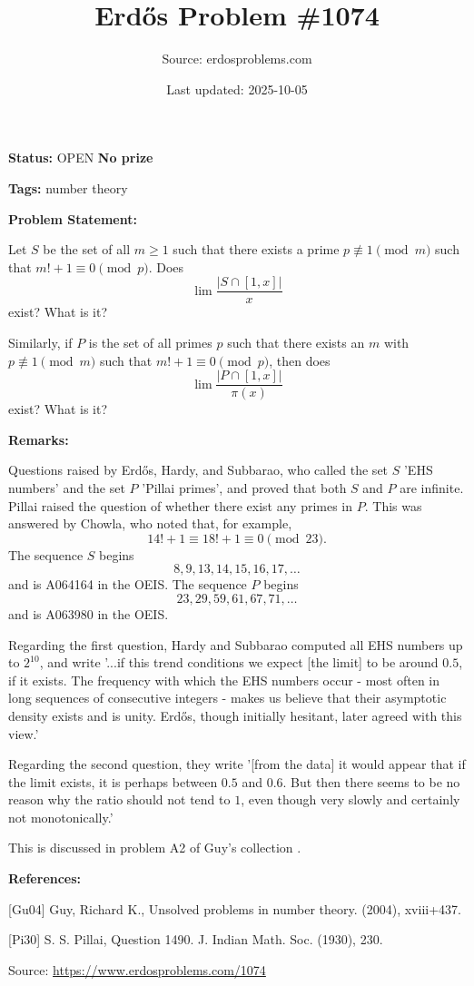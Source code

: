 \documentclass{article}
\title{Erd\H{o}s Problem \#1074}
\date{Last updated: 2025-10-05}
\author{Source: erdosproblems.com}
\begin{document}
\maketitle

\noindent\textbf{Status:} OPEN \quad \textbf{No prize}

\noindent\textbf{Tags:} number theory

\medskip
\noindent\textbf{Problem Statement:}

Let $S$ be the set of all $m\geq 1$ such that there exists a prime $p\not\equiv 1\pmod{m}$ such that $m!+1\equiv 0\pmod{p}$. Does\[\lim \frac{\lvert S\cap [1,x]\rvert}{x}\]exist? What is it?

Similarly, if $P$ is the set of all primes $p$ such that there exists an $m$ with $p\not\equiv 1\pmod{m}$ such that $m!+1\equiv 0\pmod{p}$, then does\[\lim \frac{\lvert P\cap [1,x]\rvert}{\pi(x)}\]exist? What is it?

\bigskip
\noindent\textbf{Remarks:}

Questions raised by Erd\H{o}s, Hardy, and Subbarao, who called the set $S$ 'EHS numbers' and the set $P$ 'Pillai primes', and proved that both $S$ and $P$ are infinite. Pillai \cite{Pi30} raised the question of whether there exist any primes in $P$. This was answered by Chowla, who noted that, for example,\[14!+1\equiv 18!+1\equiv 0\pmod{23}.\]The sequence $S$ begins\[8,9,13,14,15,16,17,\ldots\]and is A064164 in the OEIS. The sequence $P$ begins\[23,29,59,61,67,71,\ldots\]and is A063980 in the OEIS.

Regarding the first question, Hardy and Subbarao computed all EHS numbers up to $2^{10}$, and write '...if this trend conditions we expect [the limit] to be around $0.5$, if it exists. The frequency with which the EHS numbers occur - most often in long sequences of consecutive integers - makes us believe that their asymptotic density exists and is unity. Erd\H{o}s, though initially hesitant, later agreed with this view.'

Regarding the second question, they write '[from the data] it would appear that if the limit exists, it is perhaps between $0.5$ and $0.6$. But then there seems to be no reason why the ratio should not tend to $1$, even though very slowly and certainly not monotonically.'

This is discussed in problem A2 of Guy's collection \cite{Gu04}.

\bigskip
\noindent\textbf{References:}

[Gu04] Guy, Richard K., Unsolved problems in number theory. (2004), xviii+437.
 
 [Pi30] S. S. Pillai, Question 1490. J. Indian Math. Soc. (1930), 230.

\bigskip
\noindent\small{Source: \url{https://www.erdosproblems.com/1074}}
\end{document}
